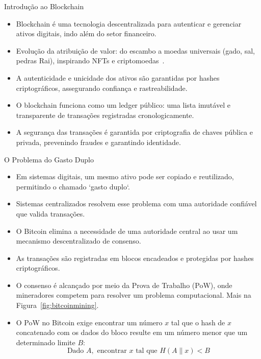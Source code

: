 \begin{frame}{Introdução ao Blockchain}

	\begin{itemize}
		\item Blockchain é uma tecnologia descentralizada para autenticar e
		      gerenciar ativos digitais, indo além do setor financeiro.
		\item Evolução da atribuição de valor: do escambo a moedas universais (gado,
		      sal, pedras Rai), inspirando NFTs e criptomoedas~\cite{bamakan2022}.
		\item A autenticidade e unicidade dos ativos são garantidas por hashes
		      criptográficos, assegurando confiança e rastreabilidade.
		\item O blockchain funciona como um ledger público: uma lista imutável e
		      transparente de transações registradas cronologicamente.
		\item A segurança das transações é garantida por criptografia de chaves
		      pública e privada, prevenindo fraudes e garantindo identidade.
	\end{itemize}

\end{frame}

\begin{frame}{O Problema do Gasto Duplo}

	\begin{itemize}
		\item Em sistemas digitais, um mesmo ativo pode ser copiado e reutilizado,
		      permitindo o chamado `gasto duplo`.~\cite{nakamoto2008bitcoin}
		\item Sistemas centralizados resolvem esse problema com uma autoridade
		      confiável que valida transações.
		\item O Bitcoin elimina a necessidade de uma autoridade central ao usar um
		      mecanismo descentralizado de consenso.
		\item As transações são registradas em blocos encadeados e protegidas por
		      hashes criptográficos.
		\item O consenso é alcançado por meio da Prova de Trabalho (PoW), onde
		      mineradores competem para resolver um problema computacional. Mais na
		      Figura~\ref{fig:bitcoinmining}.
		\item O PoW no Bitcoin exige encontrar um número $x$ tal que o hash de $x$
		      concatenado com os dados do bloco resulte em um número menor que um
		      determinado limite $B$:
		      \[
			      \text{Dado } A, \text{ encontrar } x \text{ tal que } H(A \| x) < B
		      \]
	\end{itemize}

\end{frame}


